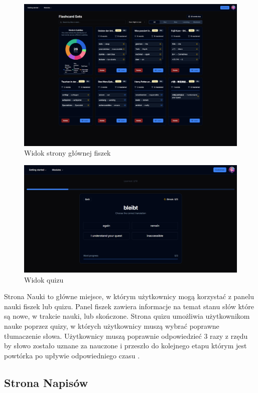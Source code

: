 \begin{figure}[H]
    \centering
    \includegraphics[width=1\textwidth]{IMAGE/FlashCards.png}
    \caption{Widok strony głównej fiszek}
    \label{fig:Strona głowna fiszek}
\end{figure}
\begin{figure}[H]
    \centering
    \includegraphics[width=1\textwidth]{IMAGE/Quiz.png}
    \caption{Widok quizu}
    \label{fig:Nauka z quizem}
\end{figure}
Strona Nauki to główne miejsce, w którym użytkownicy mogą korzystać z panelu nauki fiszek lub quizu. Panel fiszek zawiera informacje na temat stanu słów które są nowe, w trakcie nauki, lub skończone. Strona quizu umożliwia użytkownikom nauke poprzez quizy, w których użytkownicy muszą wybrać poprawne tłumaczenie słowa. Użytkownicy muszą poprawnie odpowiedzieć 3 razy z rzędu by słowo zostało uznane za nauczone i przeszło do kolejnego etapu którym jest powtórka po upływie odpowiedniego czasu \cite{mallett2012benefits}.

\subsection{Strona Napisów}

